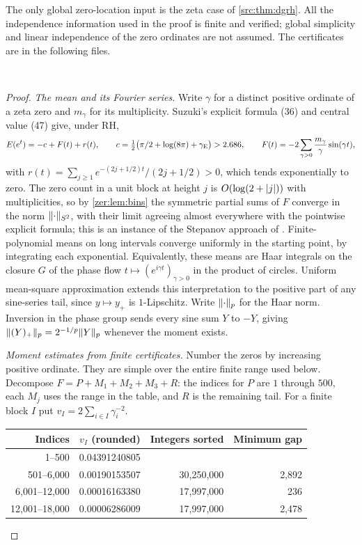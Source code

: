 The only global zero-location input is the zeta case of \cref{src:thm:dgrh}. All the
independence information used in the proof is finite and verified; global simplicity and
linear independence of the zero ordinates are not assumed. The certificates are in the
following files.
\begin{center}
\\
\end{center}

\begin{proof}
\emph{The mean and its Fourier series.} Write $\gamma$ for a distinct positive ordinate of
a zeta zero and $m_\gamma$ for its multiplicity. Suzuki's explicit formula (36) and central
value (47) give, under RH,
\[
 E(e^t)=-c+F(t)+r(t),\qquad
 c=\tfrac12\bigl(\pi/2+\log(8\pi)+\gamma_{\mathrm{E}}\bigr)>2.686,\qquad
 F(t)=-2\sum_{\gamma>0}\frac{m_\gamma}\gamma\sin(\gamma t),
\]
with $r(t)=\sum_{j\ge1}e^{-(2j+1/2)t}/(2j+1/2)>0$, which tends exponentially to zero. The
zero count in a unit block at height $j$ is $O(\log(2+\lvert j\rvert))$ with multiplicities, so by
\cref{zer:lem:bins} the symmetric partial sums of $F$ converge in the norm
$\lVert\cdot\rVert_{S^2}$, with their limit agreeing almost everywhere with the pointwise explicit
formula; this is an instance of the Stepanov approach of
\cite{KaczorowskiRamare2003Almost}. Finite-polynomial means on long intervals converge
uniformly in the starting point, by integrating each exponential. Equivalently, these means
are Haar integrals on the closure $G$ of the phase flow
$t\mapsto(e^{i\gamma t})_{\gamma>0}$ in the product of circles. Uniform mean-square
approximation extends this interpretation to the positive part of any sine-series tail,
since $y\mapsto y_+$ is $1$-Lipschitz. Write $\lVert\cdot\rVert_p$ for the Haar norm. Inversion in
the phase group sends every sine sum $Y$ to $-Y$, giving
$\lVert(Y)_+\rVert_p=2^{-1/p}\lVert Y\rVert_p$ whenever the moment exists.

\emph{Moment estimates from finite certificates.} Number the zeros by increasing positive
ordinate. They are simple over the entire finite range used below. Decompose
$F=P+M_1+M_2+M_3+R$: the indices for $P$ are $1$ through $500$, each $M_j$ uses the range
in the table, and $R$ is the remaining tail. For a finite block $I$ put
$v_I=2\sum_{i\in I}\gamma_i^{-2}$.
\begin{center}\small
\begin{tabular}{rrrr}\toprule
Indices & $v_I$ (rounded) & Integers sorted & Minimum gap\\\midrule
1--500 & 0.04391240805 & \multicolumn{2}{l}{\cite[Table~2]{BestTrudgian2015Linear}}\\
501--6,000 & 0.00190153507 & 30,250,000 & 2,892\\
6,001--12,000 & 0.00016163380 & 17,997,000 & 236\\
12,001--18,000 & 0.00006286009 & 17,997,000 & 2,478\\\bottomrule
\end{tabular}


\end{center}
\end{proof}
